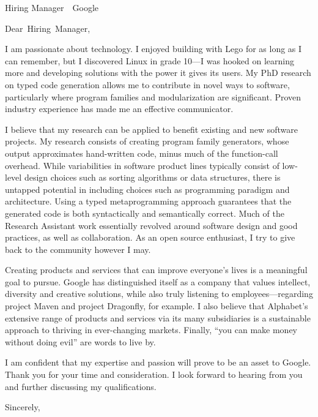 \documentclass[
fontsize=12pt,
paper=letter,
parskip=half,
enlargefirstpage=on,    %
fromalign=right,        %
fromphone=on,           %
fromemail=on,
fromrule=aftername,     %
addrfield=off,           %
backaddress=off,         %
subject=beforeopening,  %
locfield=narrow,        %
foldmarks=off,           %
]{scrlttr2}
\renewcommand{\\}{\ {\large\textperiodcentered}\ }
\begin{document}

\begin{letter}{Hiring Manager\\Google}


\opening{Dear~Hiring~Manager,}

I am passionate about technology.
I enjoyed building with Lego for as long as I can remember, but I discovered Linux in grade 10---I was hooked on learning more and developing solutions with the power it gives its users.
My PhD research on typed code generation allows me to contribute in novel ways to software, particularly where program families and modularization are significant.
Proven industry experience has made me an effective communicator.

I believe that my research can be applied to benefit existing and new software projects.
My research consists of creating program family generators, whose output approximates hand-written code, minus much of the function-call overhead.
While variabilities in software product lines typically consist of low-level design choices such as sorting algorithms or data structures, there is untapped potential in including choices such as programming paradigm and architecture.
Using a typed metaprogramming approach guarantees that the generated code is both syntactically and semantically correct.
Much of the Research Assistant work essentially revolved around software design and good practices, as well as collaboration.
As an open source enthusiast, I try to give back to the community however I may.

Creating products and services that can improve everyone's lives is a meaningful goal to pursue.
Google has distinguished itself as a company that values intellect, diversity and creative solutions, while also truly listening to employees---regarding project Maven and project Dragonfly, for example.
I also believe that Alphabet's extensive range of products and services via its many subsidiaries is a sustainable approach to thriving in ever-changing markets.
Finally, ``you can make money without doing evil'' are words to live by.

I am confident that my expertise and passion will prove to be an asset to Google.
Thank you for your time and consideration.
I look forward to hearing from you and further discussing my qualifications.
\closing{Sincerely,}


\end{letter}
\end{document}
